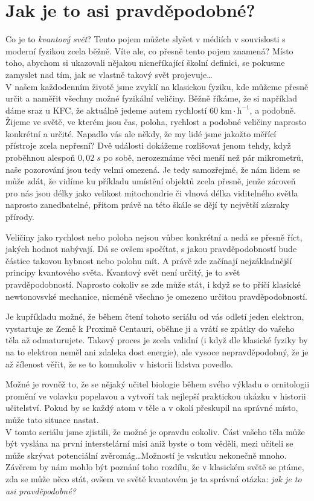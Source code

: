 \documentclass[crop=false]{standalone}
\begin{document}
\section*{Jak je to asi pravděpodobné?}
\quad

Co je to \textit{kvantový svět}? Tento pojem můžete slyšet v médiích v souvislosti s moderní fyzikou zcela běžně. Víte ale, co přesně tento pojem znamená? Místo toho, abychom si ukazovali nějakou nicneříkající školní definici, se pokusme zamyslet nad tím, jak se vlastně takový svět projevuje\dots
\\

V našem každodenním životě jsme zvyklí na klasickou fyziku, kde můžeme přesně určit a naměřit všechny možné fyzikální veličiny. Běžně říkáme, že si například dáme sraz u KFC, že aktuálně jedeme autem rychlostí $60\;\mathrm{km\cdot h^{-1}}$, a podobně. Žijeme ve světě, ve kterém jsou čas, poloha, rychlost a podobné veličiny naprosto konkrétní a určité. Napadlo vás ale někdy, že my lidé jsme jakožto měřící přístroje zcela nepřesní? Dvě události dokážeme rozlišovat jenom tehdy, když proběhnou alespoň $0,02\;\si{s}$ po sobě, nerozeznáme věci menší než pár mikrometrů, naše pozorování jsou tedy velmi omezená. Je tedy samozřejmé, že nám lidem se může zdát, že vidíme ku příkladu umístění objektů zcela přesně, jenže zároveň pro nás jsou délky jako velikost mitochondrie či vlnová délka viditelného světla
naprosto zanedbatelné, přitom právě na této škále se dějí ty největší zázraky přírody. 

Veličiny jako rychlost nebo poloha nejsou vůbec konkrétní a nedá se přesně říct, jakých hodnot nabývají. Dá se ovšem spočítat, s jakou pravděpodobností bude částice takovou hybnost nebo polohu mít. A právě zde začínají nejzákladnější principy kvantového světa. Kvantový svět není určitý, je to svět pravděpodobností. Naprosto cokoliv se zde může stát, i když se to příčí klasické newtonovsvké mechanice, nicméně všechno je omezeno určitou pravděpodobností.

Je kupříkladu možné, že během čtení tohoto seriálu od vás odletí jeden elektron, vystartuje ze Země k Proximě Centauri, oběhne ji a vrátí se zpátky do vašeho těla až odmaturujete. Takový proces je zcela validní (i když dle klasické fyziky by na to elektron neměl ani zdaleka dost energie), ale vysoce nepravděpodobný, že je až šílenost věřit, že se to komukoliv v historii lidstva povedlo.

Možné je rovněž to, že se nějaký učitel biologie během svého výkladu o ornitologii promění ve volavku popelavou a vytvoří tak nejlepší praktickou ukázku v historii učitelství. Pokud by se každý atom v těle a v okolí přeskupil na správné místo, může tato situace nastat.
\\

V tomto seriálu jsme zjistili, že možné je opravdu cokoliv. Část vašeho těla může být vyslána na první interstelární misi aniž byste o tom věděli, mezi učiteli se může skrývat potenciální zvěromág\dots Možností je vskutku nekonečně mnoho. Závěrem by nám mohlo být poznání toho rozdílu, že v klasickém světě se ptáme, zda se může něco stát, ovšem ve světě kvantovém je ta správná otázka: \textit{jak je to asi pravděpodobné?}
\end{document}
